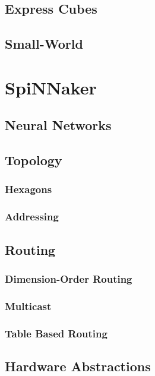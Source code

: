 \documentclass[a4paper,11pt,titlepage]{report}
\begin{document}
			\subsection{Express Cubes}
			
			\subsection{Small-World}
			
		\section{SpiNNaker}
			
			\subsection{Neural Networks}
			
			\subsection{Topology}
				
				\subsubsection{Hexagons}
				
				\subsubsection{Addressing}
			
			\subsection{Routing}
				
				\subsubsection{Dimension-Order Routing}
				
				\subsubsection{Multicast}
				
				\subsubsection{Table Based Routing}
			
			\subsection{Hardware Abstractions}
			
\end{document}
